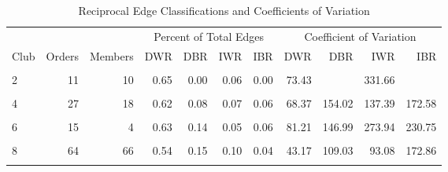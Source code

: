 \documentclass[
]{article}
\begin{document}
\begin{table}

\caption{\label{tab:summary stats}Reciprocal Edge Classifications and Coefficients of Variation}
\centering
\begin{tabular}[t]{lrrrrrrrrrr}
\toprule
\multicolumn{3}{c}{ } & \multicolumn{4}{c}{Percent of Total Edges} & \multicolumn{4}{c}{Coefficient of Variation} \\
\cmidrule(l{3pt}r{3pt}){4-7} \cmidrule(l{3pt}r{3pt}){8-11}
Club & Orders & Members & DWR & DBR & IWR & IBR & DWR & DBR & IWR & IBR\\
\midrule
\cellcolor{gray!6}{1} & \cellcolor{gray!6}{59} & \cellcolor{gray!6}{23} & \cellcolor{gray!6}{0.71} & \cellcolor{gray!6}{0.12} & \cellcolor{gray!6}{0.03} & \cellcolor{gray!6}{0.03} & \cellcolor{gray!6}{28.77} & \cellcolor{gray!6}{78.05} & \cellcolor{gray!6}{120.88} & \cellcolor{gray!6}{147.78}\\
2 & 11 & 10 & 0.65 & 0.00 & 0.06 & 0.00 & 73.43 &  & 331.66 & \\
\cellcolor{gray!6}{3} & \cellcolor{gray!6}{22} & \cellcolor{gray!6}{28} & \cellcolor{gray!6}{0.67} & \cellcolor{gray!6}{0.08} & \cellcolor{gray!6}{0.06} & \cellcolor{gray!6}{0.05} & \cellcolor{gray!6}{19.21} & \cellcolor{gray!6}{91.81} & \cellcolor{gray!6}{87.29} & \cellcolor{gray!6}{112.77}\\
4 & 27 & 18 & 0.62 & 0.08 & 0.07 & 0.06 & 68.37 & 154.02 & 137.39 & 172.58\\
\cellcolor{gray!6}{5} & \cellcolor{gray!6}{69} & \cellcolor{gray!6}{9} & \cellcolor{gray!6}{0.57} & \cellcolor{gray!6}{0.15} & \cellcolor{gray!6}{0.03} & \cellcolor{gray!6}{0.06} & \cellcolor{gray!6}{63.31} & \cellcolor{gray!6}{147.32} & \cellcolor{gray!6}{281.49} & \cellcolor{gray!6}{242.32}\\
6 & 15 & 4 & 0.63 & 0.14 & 0.05 & 0.06 & 81.21 & 146.99 & 273.94 & 230.75\\
\cellcolor{gray!6}{7} & \cellcolor{gray!6}{93} & \cellcolor{gray!6}{8} & \cellcolor{gray!6}{0.64} & \cellcolor{gray!6}{0.16} & \cellcolor{gray!6}{0.02} & \cellcolor{gray!6}{0.07} & \cellcolor{gray!6}{79.24} & \cellcolor{gray!6}{150.72} & \cellcolor{gray!6}{450.82} & \cellcolor{gray!6}{271.84}\\
8 & 64 & 66 & 0.54 & 0.15 & 0.10 & 0.04 & 43.17 & 109.03 & 93.08 & 172.86\\
\cellcolor{gray!6}{9} & \cellcolor{gray!6}{48} & \cellcolor{gray!6}{26} & \cellcolor{gray!6}{0.46} & \cellcolor{gray!6}{0.12} & \cellcolor{gray!6}{0.10} & \cellcolor{gray!6}{0.07} & \cellcolor{gray!6}{59.34} & \cellcolor{gray!6}{152.03} & \cellcolor{gray!6}{132.13} & \cellcolor{gray!6}{216.36}\\

\end{tabular}
\end{table}
\end{document}

